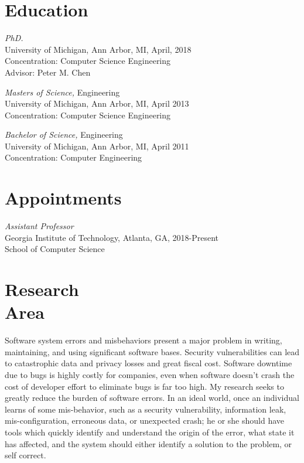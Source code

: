 \documentclass[margin, 10pt]{res} %
\begin{document}
\begin{resume}
 

\section{Education}

{\sl PhD.} \\
University of Michigan, Ann Arbor, MI, April, 2018 \\
Concentration: Computer Science Engineering \\
Advisor: Peter M. Chen

{\sl Masters of Science,} Engineering \\
University of Michigan, Ann Arbor, MI, April 2013 \\
Concentration: Computer Science Engineering

{\sl Bachelor of Science,} Engineering \\
University of Michigan, Ann Arbor, MI, April 2011 \\
Concentration: Computer Engineering

\section{Appointments}

{\sl Assistant Professor} \\
Georgia Institute of Technology, Atlanta, GA, 2018-Present \\
School of Computer Science

\section{Research \\Area}
Software system errors and misbehaviors present a major problem in
writing, maintaining, and using significant software bases.  Security
vulnerabilities can lead to catastrophic data and privacy losses and
great fiscal cost.  Software downtime due to bugs is highly costly for
companies, even when software doesn't crash the cost of developer
effort to eliminate bugs is far too high.  My research seeks to
greatly reduce the burden of software errors.  In an ideal world, once
an individual learns of some mis-behavior, such as a security
vulnerability, information leak, mis-configuration, erroneous data, or
unexpected crash; he or she should have tools which quickly identify
and understand the origin of the error, what state it has affected,
and the system should either identify a solution to the problem, or
self correct.


\end{resume}
\end{document}
